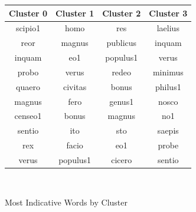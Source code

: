 \documentclass[a4paper, 12pt,notitlepage]{article} %
\newenvironment{figurecenter}{%
	\setlength\topsep{-7pt}
	\setlength\parskip{-7pt}
	\singlespacing %
	\begin{center}
	}{%
	\end{center}
\vspace{-5pt}
}
\numberwithin{dummy}{subsection}
\numberwithin{dummy}{section}
\theoremstyle{named}
\theoremstyle{definition}
\theoremstyle{definition}
\begin{document}
\begin{figure}[H]
	\begin{figurecenter}
		\begin{tabular}{| c | c | c | c |}
			\hline
			\textbf{Cluster 0} & \textbf{Cluster 1} &\textbf{Cluster 2} &\textbf{Cluster 3}  \\ \hline
			{\ttfamily  scipio1} & {\ttfamily homo}  &  {\ttfamily res} & {\ttfamily laelius} \\ \hline
			{\ttfamily reor} & {\ttfamily magnus}  &  {\ttfamily publicus} & {\ttfamily inquam} \\ \hline
			{\ttfamily inquam} & {\ttfamily eo1}  &  {\ttfamily populus1} & {\ttfamily verus} \\ \hline
			{\ttfamily probo} & {\ttfamily verus}  &  {\ttfamily redeo} & {\ttfamily minimus} \\ \hline
			{\ttfamily quaero} & {\ttfamily civitas}  &  {\ttfamily bonus} & {\ttfamily philus1} \\ \hline
			{\ttfamily magnus} & {\ttfamily fero}  &  {\ttfamily genus1} & {\ttfamily nosco} \\ \hline
			{\ttfamily censeo1} & {\ttfamily bonus}  &  {\ttfamily magnus} & {\ttfamily no1} \\ \hline
			{\ttfamily sentio} & {\ttfamily ito}  &  {\ttfamily sto} & {\ttfamily saepis} \\ \hline
			{\ttfamily rex} & {\ttfamily facio}  &  {\ttfamily eo1} & {\ttfamily probe} \\ \hline
			{\ttfamily verus} & {\ttfamily populus1}  &  {\ttfamily cicero} & {\ttfamily sentio} \\ \hline
		\end{tabular}\\
		\caption{Most Indicative Words by Cluster}
		\label{eta}
	\end{figurecenter}
\end{figure}
\end{document}
